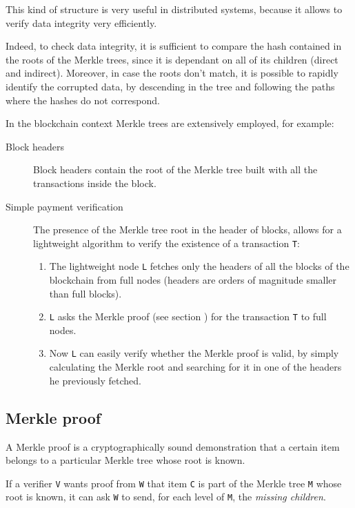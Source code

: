 \documentclass[12pt]{article}
\begin{document}
This kind of structure is very useful in distributed systems, because it allows to verify data integrity very efficiently.

Indeed, to check data integrity, it is sufficient to compare the hash contained in the roots of the Merkle trees, since it is dependant on all of its children (direct and indirect).
Moreover, in case the roots don't match, it is possible to rapidly identify the corrupted data, by descending in the tree and following the paths where the hashes do not correspond.

In the blockchain context Merkle trees are extensively employed, for example:
\begin{description}
    \item[Block headers] Block headers contain the root of the Merkle tree built with all the transactions inside the block.
    \item[Simple payment verification] The presence of the Merkle tree root in the header of blocks, allows for a lightweight algorithm to verify the existence of a transaction \verb|T|:
        \begin{enumerate}
            \item The lightweight node \verb|L| fetches only the headers of all the blocks of the blockchain from full nodes (headers are orders of magnitude smaller than full blocks).
            \item \verb|L| asks the Merkle proof (see section ) for the transaction \verb|T| to full nodes.
            \item Now \verb|L| can easily verify whether the Merkle proof is valid, by simply calculating the Merkle root and searching for it in one of the headers he previously fetched.
        \end{enumerate} 
\end{description}

\subsection{Merkle proof} \label{subsection:merkle_proof}
A Merkle proof is a cryptographically sound demonstration that a certain item belongs to a particular Merkle tree whose root is known.

If a verifier \verb|V| wants proof from \verb|W| that item \verb|C| is part of the Merkle tree \verb|M| whose root is known, it can ask \verb|W| to send, for each level of \verb|M|, the \textit{missing children}.
\end{document}
